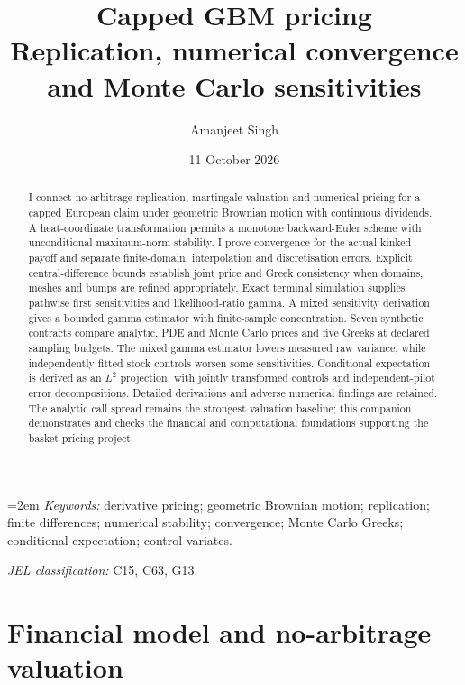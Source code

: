 \documentclass[11pt]{article}
\title{Capped GBM pricing\\[2mm]\large Replication, numerical convergence and Monte Carlo sensitivities}
\author{Amanjeet Singh}
\date{11 October 2026}
\begin{document}
\maketitle
\begin{abstract}
I connect no-arbitrage replication, martingale valuation and numerical
pricing for a capped European claim under geometric Brownian motion with
continuous dividends. A heat-coordinate transformation permits a monotone
backward-Euler scheme with unconditional maximum-norm stability. I prove
convergence for the actual kinked payoff and separate finite-domain,
interpolation and discretisation errors. Explicit central-difference bounds
establish joint price and Greek consistency when domains, meshes and bumps
are refined appropriately. Exact terminal simulation supplies pathwise
first sensitivities and likelihood-ratio gamma. A mixed sensitivity
derivation gives a bounded gamma estimator with finite-sample concentration.
Seven synthetic contracts compare analytic, PDE and Monte Carlo prices and
five Greeks at declared sampling budgets. The mixed gamma estimator lowers
measured raw variance, while independently fitted stock controls worsen
some sensitivities. Conditional expectation is derived as an $L^2$ projection, with jointly
transformed controls and independent-pilot error decompositions. Detailed
derivations and adverse numerical findings are retained. The analytic call spread remains the strongest valuation baseline;
this companion demonstrates and checks the financial and computational
foundations supporting the basket-pricing project.
\end{abstract}
\noindent\begin{minipage}{\linewidth}
\small\emergencystretch=2em
\textit{Keywords:} derivative pricing; geometric Brownian motion; replication;
finite differences; numerical stability; convergence; Monte Carlo Greeks;
conditional expectation; control variates.\par
\smallskip\textit{JEL classification:} C15, C63, G13.\par
\end{minipage}

\section{Financial model and no-arbitrage valuation}
\label{sec:cgbm-model}
\end{document}
